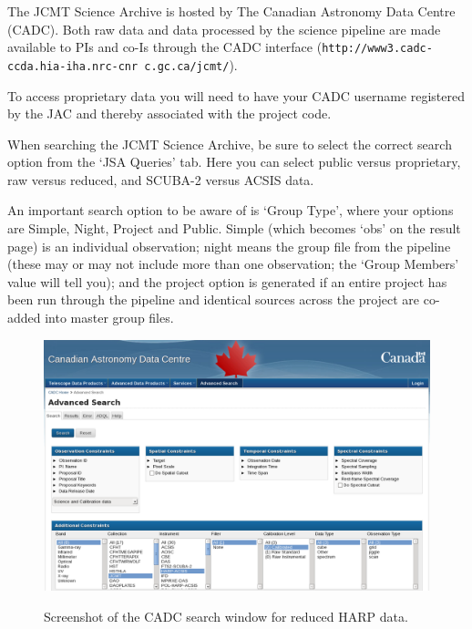 \documentclass[twoside,11pt]{article}
\renewcommand{\_}{\texttt{\symbol{95}}}
\newcommand{\url}[1]{\texttt{#1}}
\begin{document}
The JCMT Science Archive is hosted by The Canadian Astronomy Data
Centre (CADC). Both raw data and data processed by the science pipeline
are made available to PIs and co-Is through the CADC interface
(\url{http://www3.cadc-ccda.hia-iha.nrc-cnr c.gc.ca/jcmt/}).

To access proprietary data you will need to have your CADC username
registered by the JAC and thereby associated with the project code.

When searching the JCMT Science Archive, be sure to select the correct
search option from the `JSA Queries' tab. Here you can select public
versus proprietary, raw versus reduced, and SCUBA-2 versus ACSIS data.

An important search option to be aware of is `Group Type', where your
options are Simple, Night, Project and Public. Simple (which becomes
`obs' on the result page) is an individual observation; night means
the group file from the pipeline (these may or may not include more
than one observation; the `Group Members' value will tell you); and the
project option is generated if an entire project has been run through
the pipeline and identical sources across the project are co-added
into master group files.

\begin{figure}[b!]
\begin{center}
\includegraphics[width=0.98\linewidth]{sc20_cadc}
\label{fig:cadc}
\caption{Screenshot of the CADC search window for reduced HARP data.}
\end{center}
\end{figure}

\clearpage
\end{document}
